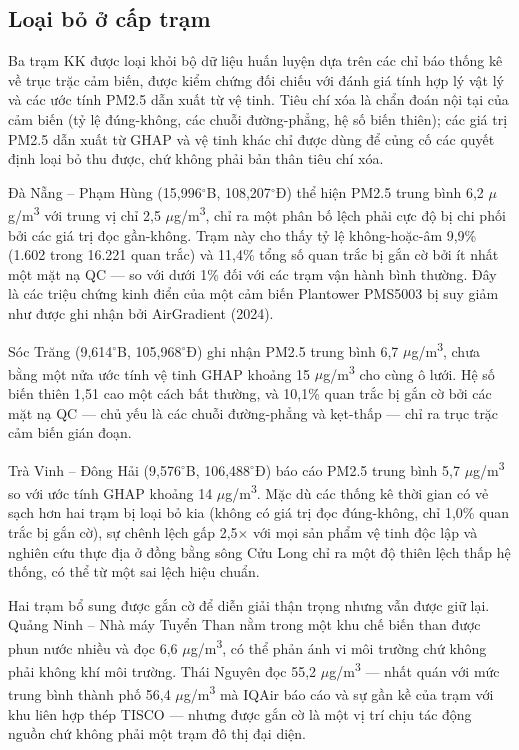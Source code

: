 \subsection{Loại bỏ ở cấp trạm}

Ba trạm KK được loại khỏi bộ dữ liệu huấn luyện dựa trên các chỉ báo thống kê về trục trặc cảm biến, được kiểm chứng đối chiếu với đánh giá tính hợp lý vật lý và các ước tính PM2.5 dẫn xuất từ vệ tinh. Tiêu chí xóa là chẩn đoán nội tại của cảm biến (tỷ lệ đúng-không, các chuỗi đường-phẳng, hệ số biến thiên); các giá trị PM2.5 dẫn xuất từ GHAP và vệ tinh khác chỉ được dùng để củng cố các quyết định loại bỏ thu được, chứ không phải bản thân tiêu chí xóa.

Đà Nẵng -- Phạm Hùng (15,996$^\circ$B, 108,207$^\circ$Đ) thể hiện PM2.5 trung bình 6,2 $\mu$g/m\textsuperscript{3} với trung vị chỉ 2,5 $\mu$g/m\textsuperscript{3}, chỉ ra một phân bố lệch phải cực độ bị chi phối bởi các giá trị đọc gần-không. Trạm này cho thấy tỷ lệ không-hoặc-âm 9,9\% (1.602 trong 16.221 quan trắc) và 11,4\% tổng số quan trắc bị gắn cờ bởi ít nhất một mặt nạ QC --- so với dưới 1\% đối với các trạm vận hành bình thường. Đây là các triệu chứng kinh điển của một cảm biến Plantower PMS5003 bị suy giảm như được ghi nhận bởi AirGradient (2024).

Sóc Trăng (9,614$^\circ$B, 105,968$^\circ$Đ) ghi nhận PM2.5 trung bình 6,7 $\mu$g/m\textsuperscript{3}, chưa bằng một nửa ước tính vệ tinh GHAP khoảng 15 $\mu$g/m\textsuperscript{3} cho cùng ô lưới. Hệ số biến thiên 1,51 cao một cách bất thường, và 10,1\% quan trắc bị gắn cờ bởi các mặt nạ QC --- chủ yếu là các chuỗi đường-phẳng và kẹt-thấp --- chỉ ra trục trặc cảm biến gián đoạn.

Trà Vinh -- Đông Hải (9,576$^\circ$B, 106,488$^\circ$Đ) báo cáo PM2.5 trung bình 5,7 $\mu$g/m\textsuperscript{3} so với ước tính GHAP khoảng 14 $\mu$g/m\textsuperscript{3}. Mặc dù các thống kê thời gian có vẻ sạch hơn hai trạm bị loại bỏ kia (không có giá trị đọc đúng-không, chỉ 1,0\% quan trắc bị gắn cờ), sự chênh lệch gấp 2,5$\times$ với mọi sản phẩm vệ tinh độc lập và nghiên cứu thực địa ở đồng bằng sông Cửu Long chỉ ra một độ thiên lệch thấp hệ thống, có thể từ một sai lệch hiệu chuẩn.

Hai trạm bổ sung được gắn cờ để diễn giải thận trọng nhưng vẫn được giữ lại. Quảng Ninh -- Nhà máy Tuyển Than nằm trong một khu chế biến than được phun nước nhiều và đọc 6,6 $\mu$g/m\textsuperscript{3}, có thể phản ánh vi môi trường chứ không phải không khí môi trường. Thái Nguyên đọc 55,2 $\mu$g/m\textsuperscript{3} --- nhất quán với mức trung bình thành phố 56,4 $\mu$g/m\textsuperscript{3} mà IQAir báo cáo và sự gần kề của trạm với khu liên hợp thép TISCO --- nhưng được gắn cờ là một vị trí chịu tác động nguồn chứ không phải một trạm đô thị đại diện.

